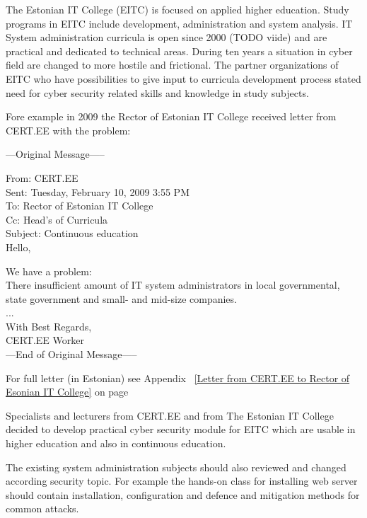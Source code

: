 The Estonian IT College (\gls{EITC}) is focused on applied higher education. Study programs in \gls{EITC} include development, administration and system analysis. IT System administration curricula is open since 2000 {\color{red}(TODO viide)} and are practical and dedicated to technical areas. During ten years a situation in cyber field are changed to more hostile and frictional. The partner organizations of \gls{EITC} who have possibilities to give input to curricula development process stated need for cyber security related skills and knowledge in study subjects.

Fore example in 2009 the Rector of Estonian IT College received letter from \gls{CERT.EE} with the problem:\par

{
\begin{spacing}{1} 
\scriptsize
---Original Message-----

From: CERT.EE\\
Sent: Tuesday, February 10, 2009 3:55 PM\\
To: Rector of Estonian IT College\\
Cc: Head's of Curricula \\
Subject: Continuous education\\
Hello,

We have a problem:\\
There insufficient amount of IT system administrators in local  governmental, state government and small- and mid-size companies.\\
...\\
With Best Regards,\\
CERT.EE Worker\\
---End of Original Message-----
\end{spacing}
}

For full letter (in Estonian) see Appendix ~\ref{Letter from CERT.EE to Rector of Esonian IT College} on page ~\pageref{Letter from CERT.EE to Rector of Esonian IT College}

Specialists and lecturers from \gls{CERT.EE} and from The Estonian IT College decided to develop practical cyber security module for \gls{EITC} which are usable in higher education and also in continuous education.

The existing system administration subjects should also reviewed and changed according security topic. For example the hands-on class for installing web server should contain installation, configuration and defence and mitigation methods for common attacks. 

